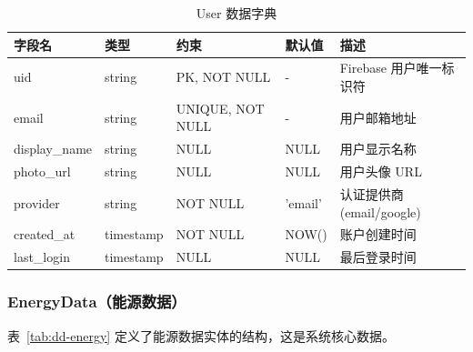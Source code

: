 \begin{table}[H]
    \centering
    \caption{User 数据字典}
    \label{tab:dd-user}
    \begin{tabularx}{\textwidth}{@{}l l l l X@{}}
        \toprule
        \textbf{字段名}  & \textbf{类型} & \textbf{约束}      & \textbf{默认值} & \textbf{描述}          \\
        \midrule
        uid           & string      & PK, NOT NULL     & -            & Firebase 用户唯一标识符     \\
        email         & string      & UNIQUE, NOT NULL & -            & 用户邮箱地址               \\
        display\_name & string      & NULL             & NULL         & 用户显示名称               \\
        photo\_url    & string      & NULL             & NULL         & 用户头像 URL             \\
        provider      & string      & NOT NULL         & 'email'      & 认证提供商 (email/google) \\
        created\_at   & timestamp   & NOT NULL         & NOW()        & 账户创建时间               \\
        last\_login   & timestamp   & NULL             & NULL         & 最后登录时间               \\
        \bottomrule
    \end{tabularx}
\end{table}

\subsubsection{EnergyData（能源数据）}

表~\ref{tab:dd-energy} 定义了能源数据实体的结构，这是系统核心数据。

